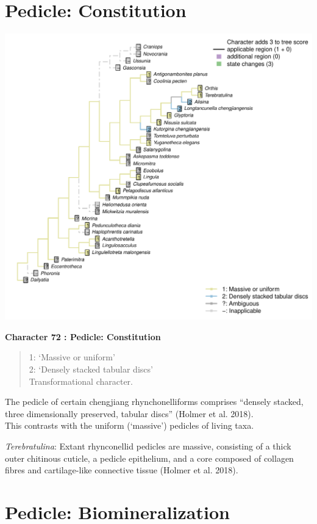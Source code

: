 \documentclass[]{book}
\theoremstyle{definition}
\theoremstyle{definition}
\theoremstyle{definition}
\theoremstyle{remark}
\begin{document}
\hypertarget{pedicle-constitution}{%
\section*{Pedicle: Constitution}\label{pedicle-constitution}}

\includegraphics{Brachiopod_phylogeny_files/figure-latex/unnamed-chunk-5-72.pdf}

\textbf{Character 72 : Pedicle: Constitution }

\begin{quote}
1: `Massive or uniform'\\
2: `Densely stacked tabular discs'\\
Transformational character.
\end{quote}

The pedicle of certain chengjiang rhynchonelliforms comprises ``densely
stacked, three dimensionally preserved, tabular discs'' (Holmer et al.
2018).\\
This contrasts with the uniform (`massive') pedicles of living taxa.

\emph{Terebratulina}: Extant rhynconellid pedicles are massive,
consisting of a thick outer chitinous cuticle, a pedicle epithelium, and
a core composed of collagen fibres and cartilage-like connective tissue
(Holmer et al. 2018).

\hypertarget{pedicle-biomineralization}{%
\section*{Pedicle: Biomineralization}\label{pedicle-biomineralization}}
\end{document}

